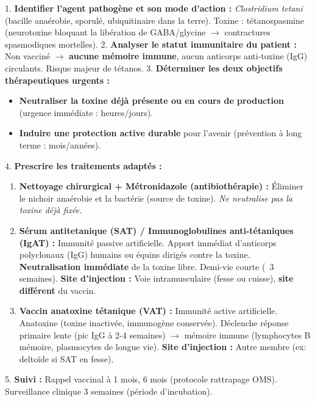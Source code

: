 \documentclass[11pt]{article}
\newcommand{\cle}[1]{{\popxbold\color{popdark}#1}}
\begin{document}
\begin{methode}
1. \textbf{Identifier l'agent pathogène et son mode d'action :} \textit{Clostridium tetani} (bacille anaérobie, sporulé, ubiquitinaire dans la terre). Toxine : tétanospasmine (neurotoxine bloquant la libération de GABA/glycine $\rightarrow$ contractures spasmodiques mortelles).
2. \textbf{Analyser le statut immunitaire du patient :} Non vacciné $\rightarrow$ \textbf{aucune mémoire immune}, aucun anticorps anti-toxine (IgG) circulants. Risque majeur de tétanos.
3. \textbf{Déterminer les deux objectifs thérapeutiques urgents :}
   \begin{itemize}
       \item \textbf{Neutraliser la toxine déjà présente ou en cours de production} (urgence immédiate : heures/jours).
       \item \textbf{Induire une protection active durable} pour l'avenir (prévention à long terme : mois/années).
   \end{itemize}
4. \textbf{Prescrire les traitements adaptés :}
   \begin{enumerate}
       \item \textbf{Nettoyage chirurgical + Métronidazole (antibiothérapie) :} Éliminer le nichoir anaérobie et la bactérie (source de toxine). \textit{Ne neutralise pas la toxine déjà fixée.}
       \item \textbf{Sérum antitetanique (SAT) / Immunoglobulines anti-tétaniques (IgAT) :} \cle{Immunité passive artificielle}. Apport immédiat d'anticorps polyclonaux (IgG) humains ou équins dirigés contre la toxine. \textbf{Neutralisation immédiate} de la toxine libre. Demi-vie courte (~3 semaines). \textbf{Site d'injection :} Voie intramusculaire (fesse ou cuisse), \textbf{site différent} du vaccin.
       \item \textbf{Vaccin anatoxine tétanique (VAT) :} \cle{Immunité active artificielle}. Anatoxine (toxine inactivée, immunogène conservée). Déclenche réponse primaire lente (pic IgG à 2-4 semaines) $\rightarrow$ mémoire immune (lymphocytes B mémoire, plasmocytes de longue vie). \textbf{Site d'injection :} Autre membre (ex: deltoïde si SAT en fesse).
   \end{enumerate}
5. \textbf{Suivi :} Rappel vaccinal à 1 mois, 6 mois (protocole rattrapage OMS). Surveillance clinique 3 semaines (période d'incubation).
\end{methode}
\end{document}
